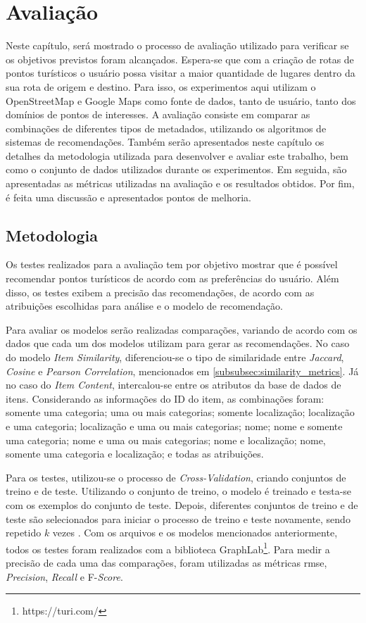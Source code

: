 \chapter{Avaliação}
\label{chp:evaluation}

Neste capítulo, será mostrado o processo de avaliação utilizado para verificar se os objetivos previstos foram alcançados. Espera-se que com a criação de rotas de pontos turísticos o usuário possa visitar a maior quantidade de lugares dentro da sua rota de origem e destino. Para isso, os experimentos aqui utilizam o OpenStreetMap e Google Maps como fonte de dados, tanto de usuário, tanto dos domínios de pontos de interesses. A avaliação consiste em comparar as combinações de diferentes tipos de metadados, utilizando os algoritmos de sistemas de recomendações. Também serão apresentados neste capítulo os detalhes da metodologia utilizada para desenvolver e avaliar este trabalho, bem como o conjunto de dados utilizados durante os experimentos. Em seguida, são apresentadas as métricas utilizadas na avaliação e os resultados obtidos. Por fim, é feita uma discussão e apresentados pontos de melhoria.

\section{Metodologia}

Os testes realizados para a avaliação tem por objetivo mostrar que é possível recomendar pontos turísticos de acordo com as preferências do usuário. Além disso, os testes exibem a precisão das recomendações, de acordo com as atribuições escolhidas para análise e o modelo de recomendação.

Para avaliar os modelos serão realizadas comparações, variando de acordo com os dados que cada um dos modelos utilizam para gerar as recomendações. No caso do modelo \textit{Item Similarity}, diferenciou-se o tipo de similaridade entre \textit{Jaccard}, \textit{Cosine} e \textit{Pearson Correlation}, mencionados em \ref{subsubsec:similarity_metrics}. Já no caso do \textit{Item Content}, intercalou-se entre os atributos da base de dados de itens. Considerando as informações do ID do item, as combinações foram: somente uma categoria; uma ou mais categorias; somente localização; localização e uma categoria; localização e uma ou mais categorias; nome; nome e somente uma categoria; nome e uma ou mais categorias; nome e localização; nome, somente uma categoria e localização; e todas as atribuições. 

Para os testes, utilizou-se o processo de \textit{Cross-Validation}, criando conjuntos de treino e de teste. Utilizando o conjunto de treino, o modelo é treinado e testa-se com os exemplos do conjunto de teste. Depois, diferentes conjuntos de treino e de teste são selecionados para iniciar o processo de treino e teste novamente, sendo repetido $k$ vezes \citep{Ricci:2010:RSH:1941884}. Com os arquivos e os modelos mencionados anteriormente, todos os testes foram realizados com a biblioteca GraphLab\footnote{https://turi.com/}. Para medir a precisão de cada uma das comparações, foram utilizadas as métricas \ac{rmse}, \textit{Precision}, \textit{Recall} e F-\textit{Score}.


